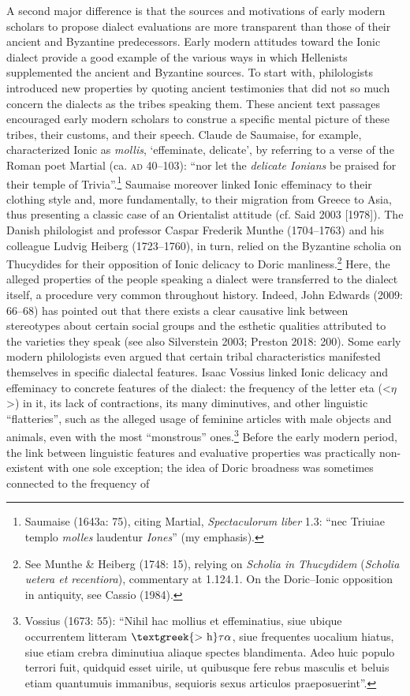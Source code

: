 \documentclass[12pt]{article}
\newenvironment{styleStandard}{\renewcommand\baselinestretch{1.25}\setlength\leftskip{0in}\setlength\rightskip{0in}\setlength\parindent{0.1972in}\setlength\parfillskip{0pt plus 1fil}\setlength\parskip{0in plus 1pt}\writerlistparindent\writerlistleftskip\leavevmode\normalfont\normalsize\writerlistlabel\ignorespaces}{\unskip\vspace{0in plus 1pt}\par}
\newcommand\writerlistleftskip{}
\newcommand\writerlistparindent{}
\newcommand\writerlistlabel{}
\begin{document}
\begin{styleStandard}
A second major difference is that the sources and motivations of early modern scholars to propose dialect evaluations are more transparent than those of their ancient and Byzantine predecessors. Early modern attitudes toward the Ionic dialect provide a good example of the various ways in which Hellenists supplemented the ancient and Byzantine sources. To start with, philologists introduced new properties by quoting ancient testimonies that did not so much concern the dialects as the tribes speaking them. These ancient text passages encouraged early modern scholars to construe a specific mental picture of these tribes, their customs, and their speech. Claude de Saumaise, for example, characterized Ionic as \textit{mollis}, ‘effeminate, delicate’, by referring to a verse of the Roman poet Martial (ca. \textsc{ad} 40–103): “nor let the \textit{delicate Ionians} be praised for their temple of Trivia”.\footnote{ Saumaise (1643a: 75), citing Martial, \textit{Spectaculorum liber} 1.3: “nec Triuiae templo \textit{molles} laudentur \textit{Iones}” (my emphasis).} Saumaise moreover linked Ionic effeminacy to their clothing style and, more fundamentally, to their migration from Greece to Asia, thus presenting a classic case of an Orientalist attitude (cf. Said 2003 [1978]). The Danish philologist and professor Caspar Frederik Munthe (1704–1763) and his colleague Ludvig Heiberg (1723–1760), in turn, relied on the Byzantine scholia on Thucydides for their opposition of Ionic delicacy to Doric manliness.\footnote{ See Munthe \& Heiberg (1748: 15), relying on \textit{Scholia in Thucydidem} (\textit{Scholia uetera et recentiora}),\textit{ }commentary at 1.124.1. On the Doric–Ionic opposition in antiquity, see Cassio (1984).} Here, the alleged properties of the people speaking a dialect were transferred to the dialect itself, a procedure very common throughout history. Indeed, John Edwards (2009: 66–68) has pointed out that there exists a clear causative link between stereotypes about certain social groups and the esthetic qualities attributed to the varieties they speak (see also Silverstein 2003; Preston 2018: 200). Some early modern philologists even argued that certain tribal characteristics manifested themselves in specific dialectal features. Isaac Vossius linked Ionic delicacy and effeminacy to concrete features of the dialect: the frequency of the letter eta ({\textless}$\eta ${\textgreater}) in it, its lack of contractions, its many diminutives, and other linguistic “flatteries”, such as the alleged usage of feminine articles with male objects and animals, even with the most “monstrous” ones.\footnote{ Vossius (1673: 55): “Nihil hac mollius et effeminatius, siue ubique occurrentem litteram $\text{\textgreek{>~h}}\tau \alpha $, siue frequentes uocalium hiatus, siue etiam crebra diminutiua aliaque spectes blandimenta. Adeo huic populo terrori fuit, quidquid esset uirile, ut quibusque fere rebus masculis et beluis etiam quantumuis immanibus, sequioris sexus articulos praeposuerint”.} Before the early modern period, the link between linguistic features and evaluative properties was practically non-existent with one sole exception; the idea of Doric broadness was sometimes connected to the frequency of 
\end{styleStandard}
\end{document}
